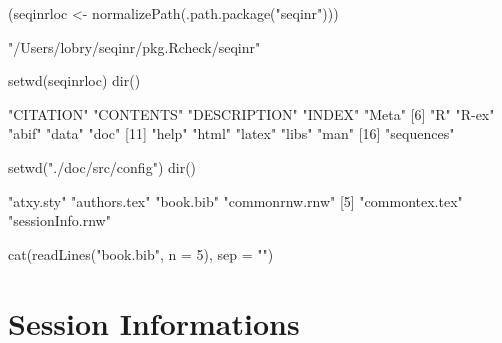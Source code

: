 \documentclass{article}
\begin{document}
\begin{Schunk}
\begin{Sinput}
 (seqinrloc <- normalizePath(.path.package("seqinr")))
\end{Sinput}
\begin{Soutput}
[1] "/Users/lobry/seqinr/pkg.Rcheck/seqinr"
\end{Soutput}
\begin{Sinput}
 setwd(seqinrloc)
 dir()
\end{Sinput}
\begin{Soutput}
 [1] "CITATION"    "CONTENTS"    "DESCRIPTION" "INDEX"       "Meta"       
 [6] "R"           "R-ex"        "abif"        "data"        "doc"        
[11] "help"        "html"        "latex"       "libs"        "man"        
[16] "sequences"  
\end{Soutput}
\begin{Sinput}
 setwd("./doc/src/config")
 dir()
\end{Sinput}
\begin{Soutput}
[1] "atxy.sty"        "authors.tex"     "book.bib"        "commonrnw.rnw"  
[5] "commontex.tex"   "sessionInfo.rnw"
\end{Soutput}
\begin{Sinput}
 cat(readLines("book.bib", n = 5), sep = "\n")
\end{Sinput}
\begin{Soutput}
@incollection{seqinr,
    author = {Charif, D. and Lobry, J.R.},
    title = {Seqin{R} 1.0-2: a contributed package to the {R} project for statistical computing devoted to biological sequences retrieval and analysis.},
    booktitle = {Structural approaches to sequence evolution: Molecules, networks, populations},
    year = {2007},
\end{Soutput}
\end{Schunk}

%
%


\section*{Session Informations}
\end{document}
